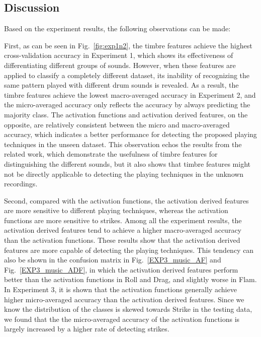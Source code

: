 \documentclass{article}
\begin{document}

\subsection{Discussion}
\label{ssec:discussion}
Based on the experiment results, the following observations can be made: 

First,  as can be seen in Fig.~\ref{fig:exp1n2}, the timbre features achieve the highest cross-validation accuracy in Experiment 1, which shows its effectiveness of differentiating different groups of sounds. However, when these features are applied to classify a completely different dataset, its inability of recognizing the same pattern played with different drum sounds is revealed. As a result, the timbre features achieve the lowest macro-averaged accuracy in Experiment 2, and the micro-averaged accuracy only reflects the accuracy by always predicting the majority class. The activation functions and activation derived features, on the opposite, are relatively consistent between the micro and macro-averaged accuracy, which indicates a better performance for detecting the proposed playing techniques in the unseen dataset. This observation echos the results from the related work, which demonstrate the usefulness of timbre features for distinguishing the different sounds, but it also shows that timbre features might not be directly applicable to detecting the playing techniques in the unknown recordings. 

Second, compared with the activation functions, the activation derived features are more sensitive to different playing techniques, whereas the activation functions are more sensitive to strikes. Among all the experiment results, the activation derived features tend to achieve a higher macro-averaged accuracy than the activation functions. These results show that the activation derived features are more capable of detecting the playing techniques. This tendency can also be shown in the confusion matrix in Fig.~\ref{EXP3_music_AF} and Fig.~\ref{EXP3_music_ADF}, in which the activation derived features perform better than the activation functions in Roll and Drag, and slightly worse in Flam. In Experiment 3, it is shown that the activation functions generally achieve higher micro-averaged accuracy than the activation derived features. Since we know the distribution of the classes is skewed towards Strike in the testing data, we found that the the micro-averaged accuracy of the activation functions is largely increased by a higher rate of detecting strikes.
\end{document}
